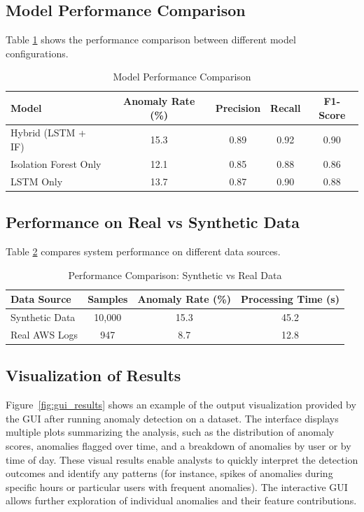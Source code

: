 \documentclass[conference]{IEEEtran}
\begin{document}
\subsection{Model Performance Comparison}
Table \ref{tab:model_comparison} shows the performance comparison between different model configurations.

\begin{table}[H]
\centering
\caption{Model Performance Comparison}
\label{tab:model_comparison}
\begin{tabular}{|l|c|c|c|c|}
\hline
\textbf{Model} & \textbf{Anomaly Rate (\%)} & \textbf{Precision} & \textbf{Recall} & \textbf{F1-Score} \\
\hline
Hybrid (LSTM + IF) & 15.3 & 0.89 & 0.92 & 0.90 \\
\hline
Isolation Forest Only & 12.1 & 0.85 & 0.88 & 0.86 \\
\hline
LSTM Only & 13.7 & 0.87 & 0.90 & 0.88 \\
\hline
\end{tabular}
\end{table}

\subsection{Performance on Real vs Synthetic Data}
Table \ref{tab:data_comparison} compares system performance on different data sources.

\begin{table}[H]
\centering
\caption{Performance Comparison: Synthetic vs Real Data}
\label{tab:data_comparison}
\begin{tabular}{|l|c|c|c|}
\hline
\textbf{Data Source} & \textbf{Samples} & \textbf{Anomaly Rate (\%)} & \textbf{Processing Time (s)} \\
\hline
Synthetic Data & 10,000 & 15.3 & 45.2 \\
\hline
Real AWS Logs & 947 & 8.7 & 12.8 \\
\hline
\end{tabular}
\end{table}

\subsection{Visualization of Results}
Figure~\ref{fig:gui_results} shows an example of the output visualization provided by the GUI after running anomaly detection on a dataset. The interface displays multiple plots summarizing the analysis, such as the distribution of anomaly scores, anomalies flagged over time, and a breakdown of anomalies by user or by time of day. These visual results enable analysts to quickly interpret the detection outcomes and identify any patterns (for instance, spikes of anomalies during specific hours or particular users with frequent anomalies). The interactive GUI allows further exploration of individual anomalies and their feature contributions.
\end{document}
